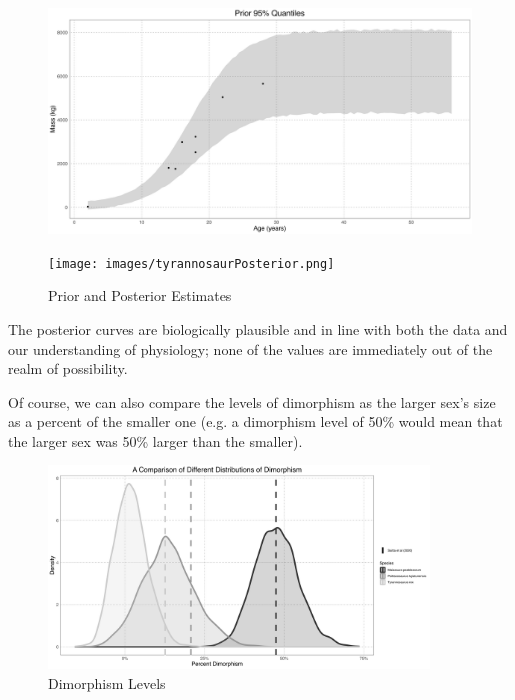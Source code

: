 \documentclass[letterpaper]{article}
\begin{document}
\begin{figure}[H]
  \centering
  \begin{minipage}[b]{0.45\textwidth}
    \centering
    \includegraphics[width=\textwidth]{images/tyrannosaurPrior.png}
  \end{minipage}
  \begin{minipage}[b]{0.45\textwidth}
    \centering
    \texttt{[image: images/tyrannosaurPosterior.png]}
  \end{minipage}
    \label{fig:tyrannosaurPriorPosterior}
    \caption{\tyran{} Prior and Posterior Estimates}
\end{figure} 

The posterior curves are biologically plausible and in line with both the data and our understanding of physiology; none of the values are immediately out of the realm of possibility.

Of course, we can also compare the levels of dimorphism as the larger sex's size as a percent of the smaller one (e.g. a dimorphism level of 50\% would mean that the larger sex was 50\% larger than the smaller).

\begin{figure}[H]
	\centering
	\includegraphics[width = 0.9\textwidth]{images/combinedDimorphism.png}
	\caption{Dimorphism Levels}
	\label{fig:combinedDimorphism}
\end{figure}
\end{document}
